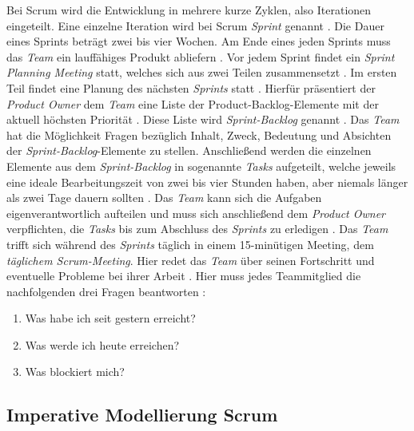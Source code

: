 Bei Scrum wird die Entwicklung in mehrere kurze Zyklen, also Iterationen eingeteilt. Eine einzelne Iteration wird bei Scrum \textit{Sprint} genannt \cite{Henning2011}. Die Dauer eines Sprints beträgt zwei bis vier Wochen. Am Ende eines jeden Sprints muss das \textit{Team} ein lauffähiges Produkt abliefern \cite{Wolf2011}. Vor jedem Sprint findet ein \textit{Sprint Planning Meeting} statt, welches sich aus zwei Teilen zusammensetzt \cite{Pichler2010}. Im ersten Teil findet eine Planung des nächsten \textit{Sprints} statt \cite{Lacey2012}. Hierfür präsentiert der \textit{Product Owner} dem \textit{Team} eine Liste der Product-Backlog-Elemente mit der aktuell höchsten Priorität \cite{Schwaber2004, Schwaber2007,Pichler2010}. Diese Liste wird \textit{Sprint-Backlog} genannt \cite{Wolf2011}. Das \textit{Team} hat die Möglichkeit Fragen bezüglich Inhalt, Zweck, Bedeutung und Absichten der \textit{Sprint-Backlog}-Elemente zu stellen. Anschließend werden die einzelnen Elemente aus dem \textit{Sprint-Backlog} in sogenannte \textit{Tasks} aufgeteilt, welche jeweils eine ideale Bearbeitungszeit von zwei bis vier Stunden haben, aber niemals länger als zwei Tage dauern sollten \cite{Wolf2011}. Das \textit{Team} kann sich die Aufgaben eigenverantwortlich aufteilen und muss sich anschließend dem \textit{Product  Owner} verpflichten, die \textit{Tasks} bis zum Abschluss des \textit{Sprints} zu erledigen \cite{Wolf2011, Keith2010,Pichler2010}.
Das  \textit{Team} trifft sich während des \textit{Sprints} täglich in einem 15-minütigen Meeting, dem \textit{täglichem Scrum-Meeting}. Hier redet das \textit{Team} über seinen Fortschritt und eventuelle Probleme bei ihrer Arbeit \cite{Keith2010}. Hier muss jedes Teammitglied die nachfolgenden drei Fragen beantworten \cite{Wolf2011}:
   \begin{enumerate}
      \item Was habe ich seit gestern erreicht?
      \item Was werde ich heute erreichen?
      \item Was blockiert mich?
      \end {enumerate}
      
\subsection{Imperative Modellierung Scrum}


